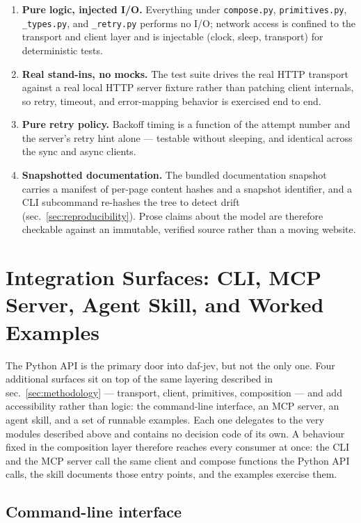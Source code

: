 \documentclass[
  english,
]{article}
\providecommand{\tightlist}{%
  \setlength{\itemsep}{0pt}\setlength{\parskip}{0pt}}
\begin{document}
\begin{enumerate}
\def\labelenumi{\arabic{enumi}.}
\tightlist
\item
  \textbf{Pure logic, injected I/O.} Everything under
  \texttt{compose.py}, \texttt{primitives.py}, \texttt{\_types.py}, and
  \texttt{\_retry.py} performs no I/O; network access is confined to the
  transport and client layer and is injectable (clock, sleep, transport)
  for deterministic tests.
\item
  \textbf{Real stand-ins, no mocks.} The test suite drives the real HTTP
  transport against a real local HTTP server fixture rather than
  patching client internals, so retry, timeout, and error-mapping
  behavior is exercised end to end.
\item
  \textbf{Pure retry policy.} Backoff timing is a function of the
  attempt number and the server's retry hint alone --- testable without
  sleeping, and identical across the sync and async clients.
\item
  \textbf{Snapshotted documentation.} The bundled documentation snapshot
  carries a manifest of per-page content hashes and a snapshot
  identifier, and a CLI subcommand re-hashes the tree to detect drift
  (sec.~\ref{sec:reproducibility}). Prose claims about the model are
  therefore checkable against an immutable, verified source rather than
  a moving website.
\end{enumerate}

\newpage

\section{Integration Surfaces: CLI, MCP Server, Agent Skill, and Worked
Examples}\label{sec:integration_surfaces}

The Python API is the primary door into daf-jev, but not the only one.
Four additional surfaces sit on top of the same layering described in
sec.~\ref{sec:methodology} --- transport, client, primitives,
composition --- and add accessibility rather than logic: the
command-line interface, an MCP server, an agent skill, and a set of
runnable examples. Each one delegates to the very modules described
above and contains no decision code of its own. A behaviour fixed in the
composition layer therefore reaches every consumer at once: the CLI and
the MCP server call the same client and compose functions the Python API
calls, the skill documents those entry points, and the examples exercise
them.

\subsection{Command-line interface}\label{command-line-interface}
\end{document}
